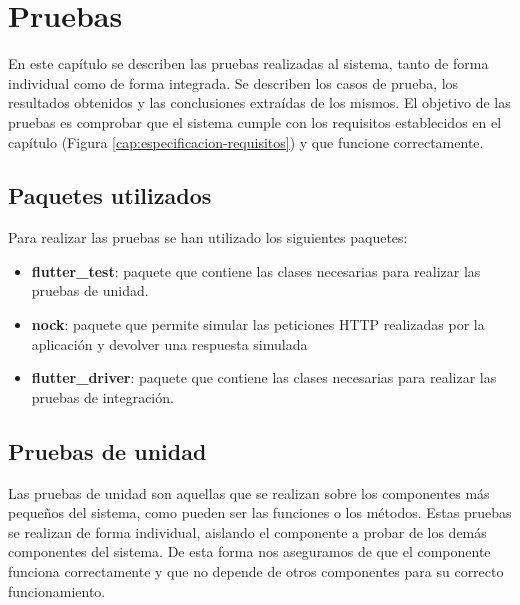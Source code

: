 \chapter{Pruebas}
\label{cap:pruebas}
En este capítulo se describen las pruebas realizadas al sistema, tanto de forma individual como de forma integrada. Se describen los casos de prueba, los resultados obtenidos y las conclusiones extraídas de los mismos.
El objetivo de las pruebas es comprobar que el sistema cumple con los requisitos establecidos en el capítulo (Figura \ref{cap:especificacion-requisitos}) y que funcione correctamente.

\section{Paquetes utilizados}
\label{sec:paquetes-utilizados}
Para realizar las pruebas se han utilizado los siguientes paquetes:

\begin{itemize}
    \item \textbf{flutter\_test}: paquete que contiene las clases necesarias para realizar las pruebas de unidad.
    \item \textbf{nock}: paquete que permite simular las peticiones HTTP realizadas por la aplicación y devolver una respuesta simulada
    \item \textbf{flutter\_driver}: paquete que contiene las clases necesarias para realizar las pruebas de integración. 
\end{itemize}


\section{Pruebas de unidad}
\label{sec:pruebas-unidad}
Las pruebas de unidad son aquellas que se realizan sobre los componentes más pequeños del sistema, como pueden ser las funciones o los métodos. Estas pruebas se realizan de forma individual, aislando el componente a probar de los demás componentes del sistema. 
De esta forma nos aseguramos de que el componente funciona correctamente y que no depende de otros componentes para su correcto funcionamiento.
\newpage



